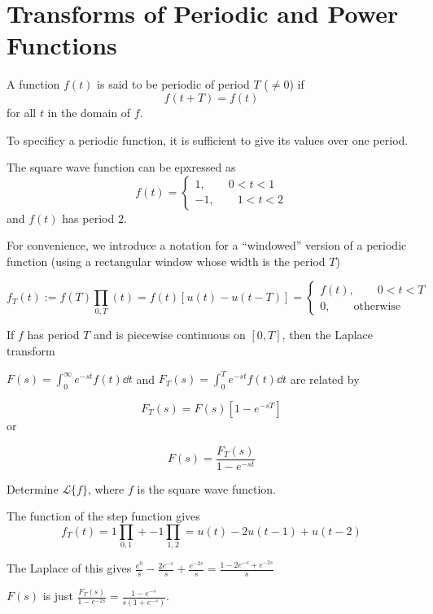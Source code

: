 \documentclass[../diffeq.tex]{subfiles}
\begin{document}
\pagebreak
\section{Transforms of Periodic and Power Functions}
\begin{definition}
    A function $f(t)$ is said to be periodic of period $T$ ($\neq 0$) if 
    \[ f(t+T)=f(t) \]
    for all $t$ in the domain of $f$.
\end{definition}

To specificy a periodic function, it is sufficient to give its values over one period.

The square wave function can be epxressed as 
\[ f(t) = \begin{cases}
    1, \qquad 0<t<1 \\
    -1, \qquad 1<t<2 
\end{cases} \]
and $f(t)$ has period $2$.

For convenience, we introduce a notation for a ``windowed'' version of a periodic function (using a rectangular window whose width is the period $T$)

\[ f_T(t) := f(T)\prod_{0,T}(t)=f(t)[u(t)-u(t-T)]=\begin{cases}
    f(t),\qquad 0<t<T\\
    0, \qquad \text{otherwise}
\end{cases}\] 

\begin{theorem}
    If $f$ has period $T$ and is piecewise continuous on $[0,T]$, then the Laplace transform 
    
    $F(s)=\int_0^{\infty} e^{-st}f(t)\dd t$ and $F_T(s)=\int_0^T e^{-st}f(t)\dd t$ are related by 

    \[ F_T(s)=F(s)[1-e^{-sT}] \] or 


    \[ F(s)=\frac{F_T(s)}{1-e^{-st}}\] 
\end{theorem}

\begin{example}
    Determine $\mathcal{L}\{f\}$, where $f$ is the square wave function.

    The function of the step function gives 
    \[ f_T(t)=1\prod_{0,1}+-1\prod_{1,2}=u(t)-2u(t-1)+u(t-2) \]

    The Laplace of this gives $\frac{e^0}{s}-\frac{2e^{-s}}{s}+\frac{e^{-2s}}{s} = \frac{1-2e^{-s}+e^{-2s}}{s}$

    $F(s)$ is just $\frac{F_T(s)}{1-e^{-2s}} = \frac{1-e^{-s}}{s(1+e^{-s})}$.
\end{example}
\end{document}
